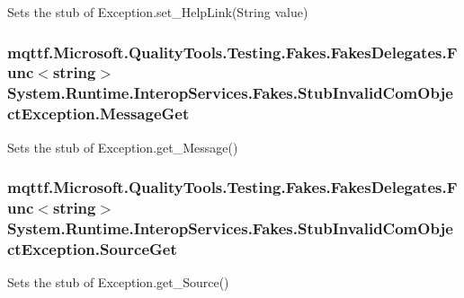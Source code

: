 Sets the stub of Exception.\-set\-\_\-\-Help\-Link(\-String value)

\hypertarget{class_system_1_1_runtime_1_1_interop_services_1_1_fakes_1_1_stub_invalid_com_object_exception_ab79cd77449eb755c8c9c979b2c5cd476}{
\subsubsection[{Message\-Get}]{\setlength{\rightskip}{0pt plus 5cm}mqttf.\-Microsoft.\-Quality\-Tools.\-Testing.\-Fakes.\-Fakes\-Delegates.\-Func$<$string$>$ System.\-Runtime.\-Interop\-Services.\-Fakes.\-Stub\-Invalid\-Com\-Object\-Exception.\-Message\-Get}}\label{class_system_1_1_runtime_1_1_interop_services_1_1_fakes_1_1_stub_invalid_com_object_exception_ab79cd77449eb755c8c9c979b2c5cd476}


Sets the stub of Exception.\-get\-\_\-\-Message()

\hypertarget{class_system_1_1_runtime_1_1_interop_services_1_1_fakes_1_1_stub_invalid_com_object_exception_ad22586f5e4601c8e0ef358f808ec080a}{
\subsubsection[{Source\-Get}]{\setlength{\rightskip}{0pt plus 5cm}mqttf.\-Microsoft.\-Quality\-Tools.\-Testing.\-Fakes.\-Fakes\-Delegates.\-Func$<$string$>$ System.\-Runtime.\-Interop\-Services.\-Fakes.\-Stub\-Invalid\-Com\-Object\-Exception.\-Source\-Get}}\label{class_system_1_1_runtime_1_1_interop_services_1_1_fakes_1_1_stub_invalid_com_object_exception_ad22586f5e4601c8e0ef358f808ec080a}


Sets the stub of Exception.\-get\-\_\-\-Source()

